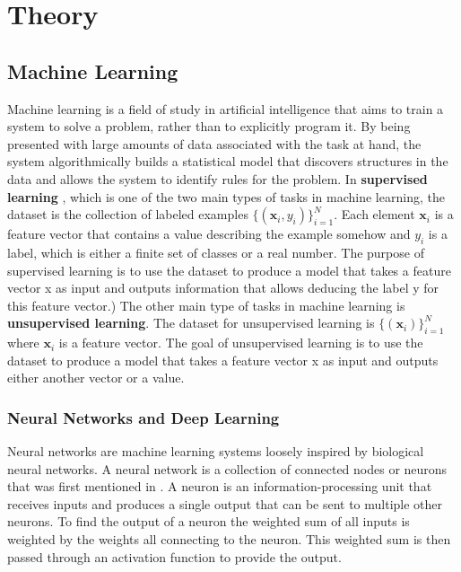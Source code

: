 \documentclass[nofilelist]{cslthse-msc}
\begin{document}
\chapter{Theory}
\section{Machine Learning}
Machine learning \citep{franoischollet2017learning} is a field of study in artificial intelligence that aims to train a system to solve a problem, rather than to explicitly program it. By being presented with large amounts of data associated with the task at hand, the system algorithmically builds a statistical model that discovers structures in the data and allows the system to identify rules for the problem. 
In \textbf{supervised learning} \citep{100pageBurkov}, which is one of the two main types of tasks in machine learning, the dataset is the collection of labeled examples $\{(\mathbf{x}_i, y_i)\}_{i=1}^N.$ Each element $\mathbf{x}_i$ is a feature vector that contains a value describing the example somehow and $y_i$ is a label, which is either a finite set of classes or a real number. The purpose of supervised learning is to use the dataset to produce a model that takes a feature vector x as input and outputs information that allows deducing the label y for this feature vector.) 
The other main type of tasks in machine learning is \textbf{unsupervised learning}. The dataset for unsupervised learning is $\{ (\mathbf{x}_i)\}_{i=1}^N$ where $\mathbf{x}_i$ is a feature vector. The goal of unsupervised learning is to use the dataset to produce a model that takes a feature vector x as input and outputs either another vector or a value. 



\subsection{Neural Networks and Deep Learning}

Neural networks are machine learning systems loosely inspired by biological neural networks. A neural network is a collection of connected nodes or neurons that was first mentioned in \citet{mcculloch1943}. A neuron \citep{dawson1998ann} is an information-processing unit that receives inputs and produces a single output that can be sent to multiple other neurons. To find the output of a neuron the weighted sum of all inputs is weighted by the weights all connecting to the neuron. This weighted sum is then passed through an activation function to provide the output.
\end{document}
